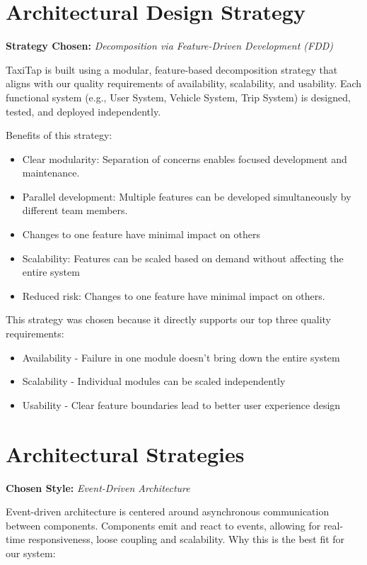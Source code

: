 \documentclass[12pt]{article}
\begin{document}
\section{Architectural Design Strategy}

\textbf{Strategy Chosen:} \textit{Decomposition via Feature-Driven Development (FDD)}

TaxiTap is built using a modular, feature-based decomposition strategy that aligns with our quality requirements of availability, scalability, and usability. Each functional system (e.g., User System, Vehicle System, Trip System) is designed, tested, and deployed independently.

Benefits of this strategy:

\begin{itemize}
  \item Clear modularity: Separation of concerns enables focused development and maintenance.
  \item Parallel development: Multiple features can be developed simultaneously by different team members.
  \item Changes to one feature have minimal impact on others
  \item Scalability: Features can be scaled based on demand without affecting the entire system
  \item Reduced risk: Changes to one feature have minimal impact on others.
\end{itemize}

This strategy was chosen because it directly supports our top three quality requirements:

\begin{itemize}
\item Availability - Failure in one module doesn't bring down the entire system
\item Scalability - Individual modules can be scaled independently
\item Usability - Clear feature boundaries lead to better user experience design
\end{itemize}

\section{Architectural Strategies}
\textbf{Chosen Style:} \textit{Event-Driven Architecture}

Event-driven architecture is centered around asynchronous communication between components. Components emit and react to events, allowing for real-time responsiveness, loose coupling and scalability.
Why this is the best fit for our system:
\end{document}

